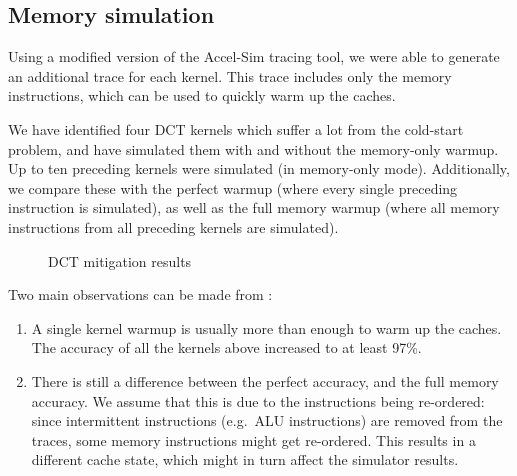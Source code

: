 \documentclass[5p,numvwe]{elsarticle}
\begin{document}
    \subsection{Memory simulation}\label{subsec:mitig-mem}
    Using a modified version of the Accel-Sim tracing tool, we were able to generate an additional trace for each kernel.
    This trace includes only the memory instructions, which can be used to quickly warm up the caches.

    We have identified four DCT kernels which suffer a lot from the cold-start problem, and have simulated them with and without the memory-only warmup.
    Up to ten preceding kernels were simulated (in memory-only mode).
    Additionally, we compare these with the perfect warmup (where every single preceding instruction is simulated), as well as the full memory warmup (where all memory instructions from all preceding kernels are simulated).

    \begin{figure}
        \centering
        \caption{DCT mitigation results}
        \label{fig:mitig-dct}
    \end{figure}

    Two main observations can be made from :
    \begin{enumerate}
        \item A single kernel warmup is usually more than enough to warm up the caches.
        The accuracy of all the kernels above increased to at least 97\%.
        \item There is still a difference between the perfect accuracy, and the full memory accuracy.
        We assume that this is due to the instructions being re-ordered: since intermittent instructions (e.g.\ ALU instructions) are removed from the traces, some memory instructions might get re-ordered.
        This results in a different cache state, which might in turn affect the simulator results.
    \end{enumerate}
\end{document}
